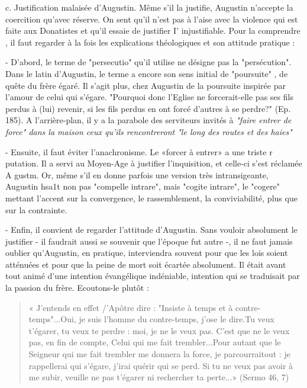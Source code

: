 c.	Justification malaisée d'Augustin.  Même s'il la justifie, Augustin n'accepte la coercition qu'avec réserve. On sent qu'il n'est pas à l'aise avec la violence qui est faite aux Donatistes et qu'il essaie de justifier I' injustifiable. Pour la comprendre , il faut regarder à la fois les explications théologiques et son attitude pratique :

-	D'abord, le terme de "persecutio" qu'il utilise ne désigne pas la "persécution". Dans le latin d'Augustin, le terme a encore son sens initial de "poursuite" , de quête du frère égaré. Il s'agit plus, chez Augustin de la poursuite inspirée par l'amour de celui qui s'égare. "Pourquoi donc l'Eglise ne forcerait-elle pas ses fils perdus à (lui) revenir, si les fils perdus en ont forcé d'autres à se perdre?" (Ep. 185).  A l'arrière-plan, il y a la parabole des serviteurs invités à \textit{"faire entrer
de force" dans la maison ceux qu'ils rencontreront "le long des routes et des haies"}

-	Ensuite, il faut éviter l'anachronisme.  Le «forcer à entrer» a une triste r putation. Il a servi au Moyen-Age à justifier l'inquisition, et celle-ci s'est réclamée A gustm.	Or, même s'il en donne parfois une version très intransigeante, Augustin hsa1t non pas "compelle intrare", mais "cogite intrare", le "cogere" mettant l'accent
sur la convergence, le rassemblement, la conviviabilité, plus que sur la contrainte.

- Enfin, il convient de regarder l'attitude  d'Augustin. Sans vouloir absolument le justifier - il faudrait aussi se souvenir que l'époque fut autre -, il ne faut jamais oublier qu'Augustin, en pratique, interviendra souvent pour que les lois soient atténuées et pour que la peine de mort soit écartée absolument. Il était avant tout animé d'une intention évangélique indéniable, intention qui se traduisait par la passion du frère. Ecoutons-le plutôt :
\begin{quote}
    « J'entends en effet /'Apôtre dire : "Insiste à temps et à contre-temps"...Oui, je suis l'homme du contre-temps, j'ose le dire.Tu veux t'égarer, tu veux te perdre : moi, je ne le veux pas. C'est que ne le veux pas, en fin de compte, Celui qui me fait trembler...Pour autant que le Seigneur qui me fait trembler me donnera la force, je parcourraitout : je rappellerai qui s'égare, j'irai quérir qui se perd. Si tu ne veux pas avoir à me subir, veuille ne pas t'égarer ni rechercher ta perte...» (Sermo 46, 7)
\end{quote}


